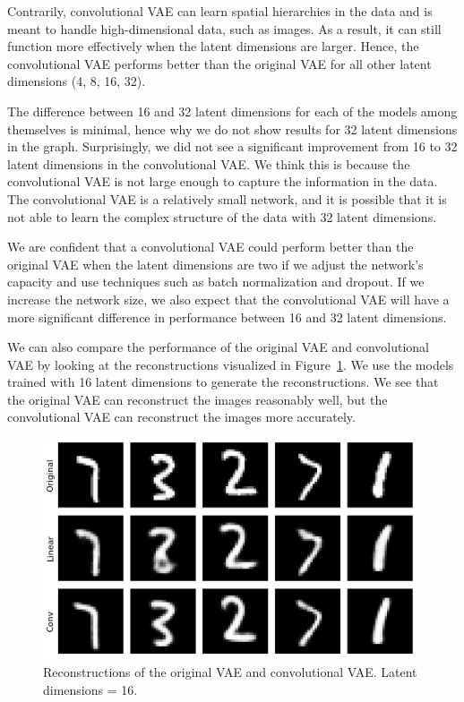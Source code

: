 Contrarily, convolutional VAE can learn spatial hierarchies in the data and is meant to handle high-dimensional data, such as images. As a result, it can still function more effectively when the latent dimensions are larger. Hence, the convolutional VAE performs better than the original VAE for all other latent dimensions (4, 8, 16, 32).

The difference between 16 and 32 latent dimensions for each of the models among themselves is minimal, hence why we do not show results for 32 latent dimensions in the graph. Surprisingly, we did not see a significant improvement from 16 to 32 latent dimensions in the convolutional VAE. We think this is because the convolutional VAE is not large enough to capture the information in the data. The convolutional VAE is a relatively small network, and it is possible that it is not able to learn the complex structure of the data with 32 latent dimensions.

We are confident that a convolutional VAE could perform better than the original VAE when the latent dimensions are two if we adjust the network's capacity and use techniques such as batch normalization and dropout. If we increase the network size, we also expect that the convolutional VAE will have a more significant difference in performance between 16 and 32 latent dimensions. 

We can also compare the performance of the original VAE and convolutional VAE by looking at the reconstructions visualized in Figure~\ref{fig:reconstructions}. We use the models trained with 16 latent dimensions to generate the reconstructions. We see that the original VAE can reconstruct the images reasonably well, but the convolutional VAE can reconstruct the images more accurately.


\begin{figure}[H]
    \centering
    \includegraphics[width=11cm]{images/reconstructions.png}
    \caption{Reconstructions of the original VAE and convolutional VAE. Latent dimensions = 16.}
    \label{fig:reconstructions}
\end{figure}

